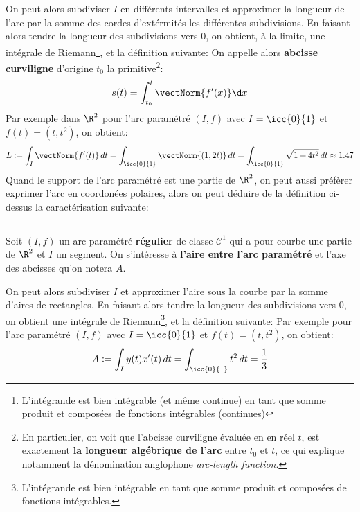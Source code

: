 On peut alors subdiviser \(I\) en différents intervalles et approximer la longueur de l'arc par la somme des cordes d'extérmités les différentes subdivisions. En faisant alors tendre la longueur des subdivisions vers 0, on obtient, à la limite, une intégrale de Riemann\footnote[1]{L'intégrande est bien intégrable (et même continue) en tant que somme produit et composées de fonctions intégrables (continues)}, et la définition suivante:
On appelle alors \textbf{abcisse curviligne} d'origine \(t_0\) la primitive\footnote[2]{En particulier, on voit que l'abcisse curviligne évaluée en en réel \(t\), est exactement \textbf{la longueur algébrique de l'arc} entre \(t_0\) et \(t\), ce qui explique notamment la dénomination anglophone \textit{arc-length function}.}:
\[
   s(t) = \int_{t_0}^{t} \vectNorm{f'(x)} \d x
\]
Par exemple dans \(\R^2\) pour l'arc paramétré \((I, f)\) avec \(I = \icc{0}{1}\) et \(f(t) = (t, t^2)\), on obtient:
\[
   L := \int_{I} \vectNorm{f'(t)}\,dt = \int_{\icc{0}{1}} \vectNorm{(1, 2t)}\,dt = \int_{\icc{0}{1}}\sqrt{1 + 4t^2}\,dt \approx 1.47
\]
Quand le support de l'arc paramétré est une partie de \(\R^2\), on peut aussi préfèrer exprimer l'arc en coordonées polaires, alors on peut déduire de la définition ci-dessus la caractérisation suivante:

\pagebreak
\subsection*{}
Soit \((I, f)\) un arc paramétré \textbf{régulier} de classe \(\mathcal{C}^1\) qui a pour courbe une partie de \(\R^2\) et \(I\) un segment. On s'intéresse à \textbf{l'aire entre l'arc paramétré} et l'axe des abcisses qu'on notera \(A\).

On peut alors subdiviser \(I\) et approximer l'aire sous la courbe par la somme d'aires de rectangles. En faisant alors tendre la longueur des subdivisions vers 0, on obtient une intégrale de Riemann\footnote[1]{\label{note1}L'intégrande est bien intégrable en tant que somme produit et composées de fonctions intégrables.}, et la définition suivante:
Par exemple pour l'arc paramétré \((I, f)\) avec \(I = \icc{0}{1}\) et \(f(t) = (t, t^2)\), on obtient:
\[
   A := \int_I y(t)x'(t)\, dt = \int_{\icc{0}{1}} t^2\, dt = \frac{1}{3}
\]


